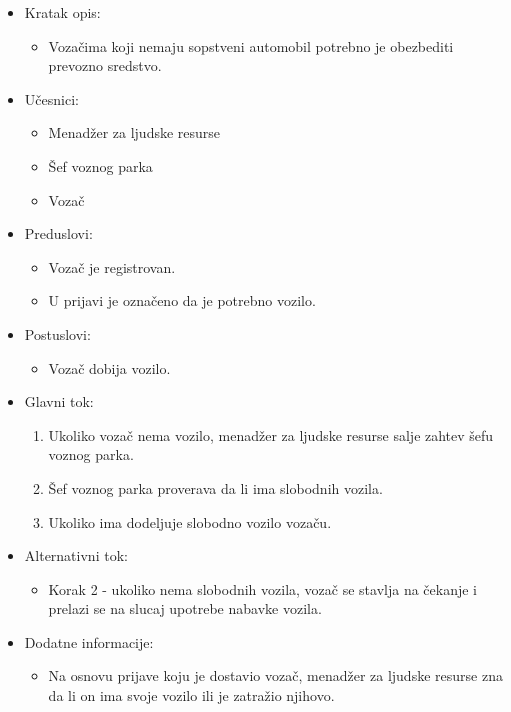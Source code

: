 \begin{itemize}
	\item Kratak opis:
		\begin{itemize}
			\item Vozačima koji nemaju sopstveni automobil potrebno je obezbediti prevozno sredstvo.		
		\end{itemize}
	\item Učesnici:
		\begin{itemize}
		    \item Menadžer za ljudske resurse
		    \item Šef voznog parka
		    \item Vozač
		\end{itemize}
	\item Preduslovi:
		\begin{itemize}
		    \item Vozač je registrovan.
		    \item U prijavi je označeno da je potrebno vozilo.
		\end{itemize}
	\item Postuslovi:
		\begin{itemize}
			\item Vozač dobija vozilo.
	    \end{itemize}
	\item Glavni tok:
		\begin{enumerate}
		    \item Ukoliko vozač nema vozilo, menadžer za ljudske resurse salje zahtev šefu voznog parka.
		    \item Šef voznog parka proverava da li ima slobodnih vozila.
		    \item Ukoliko ima dodeljuje slobodno vozilo vozaču.
		\end{enumerate}
	\item Alternativni tok:
		\begin{itemize}
		    \item Korak 2 - ukoliko nema slobodnih vozila, vozač se stavlja na čekanje i prelazi se na slucaj upotrebe nabavke vozila.
		\end{itemize}
	\item Dodatne informacije:
		\begin{itemize}
			\item Na osnovu prijave koju je dostavio vozač, menadžer za ljudske resurse zna da li on ima svoje vozilo ili je zatražio njihovo.
		\end{itemize}
\end{itemize}


